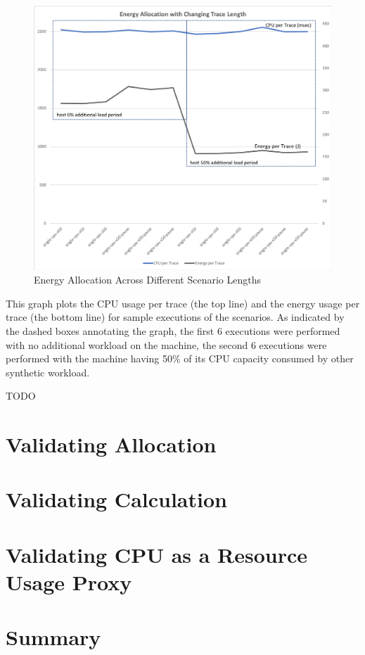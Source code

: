 \begin{figure}
\centering
\includegraphics[width=1.0\textwidth]{Figures/validation-scenariolength}
\caption{Energy Allocation Across Different Scenario Lengths}
\label{figure:validation-scenariolength}
\end{figure}

This graph plots the CPU usage per trace (the top line) and the energy usage per trace (the bottom line) for sample executions of the scenarios.  As indicated by the dashed boxes annotating the graph, the first 6 executions were performed with no additional workload on the machine, the second 6 executions were performed with the machine having 50\% of its CPU capacity consumed by other synthetic workload.

TODO 






\section{Validating Allocation}

\section{Validating Calculation}

\section{Validating CPU as a Resource Usage Proxy}

\section{Summary}

